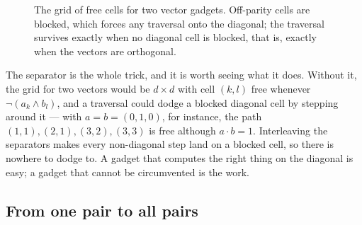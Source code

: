 \begin{figure}[ht]
\centering
{}
\caption{The grid of free cells for two vector gadgets. Off-parity cells are
blocked, which forces any traversal onto the diagonal; the traversal survives
exactly when no diagonal cell is blocked, that is, exactly when the vectors are
orthogonal.}
\label{fig:frechet-vector-gadget}
\end{figure}

\begin{intuition}
The separator is the whole trick, and it is worth seeing what it does. Without
it, the grid for two vectors would be $d \times d$ with cell $(k,l)$ free
whenever $\neg(a_k \wedge b_l)$, and a traversal could dodge a blocked diagonal
cell by stepping around it --- with $a = b = (0,1,0)$, for instance, the path
$(1,1),(2,1),(3,2),(3,3)$ is free although $a \cdot b = 1$. Interleaving the
separators makes every non-diagonal step land on a blocked cell, so there is
nowhere to dodge to. A gadget that computes the right thing on the diagonal is
easy; a gadget that cannot be circumvented is the work.
\end{intuition}

\subsection{From one pair to all pairs}

